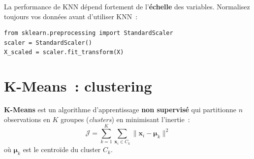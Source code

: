 \begin{bonnepratique}
La performance de KNN d\'epend fortement de l'\textbf{\'echelle} des variables. Normalisez toujours vos donn\'ees avant d'utiliser KNN~:
\begin{verbatim}
from sklearn.preprocessing import StandardScaler
scaler = StandardScaler()
X_scaled = scaler.fit_transform(X)
\end{verbatim}
\end{bonnepratique}

\section{K-Means~: clustering}
\label{sec:kmeans}


\begin{definition}[K-Means]
\textbf{K-Means} est un algorithme d'apprentissage \textbf{non supervis\'e} qui partitionne $n$ observations en $K$ groupes (\textit{clusters}) en minimisant l'inertie~:
\[
\mathcal{J} = \sum_{k=1}^{K}\sum_{\mathbf{x}_i \in C_k} \| \mathbf{x}_i - \boldsymbol{\mu}_k \|^2
\]
o\`u $\boldsymbol{\mu}_k$ est le centro\"ide du cluster $C_k$.
\end{definition}


